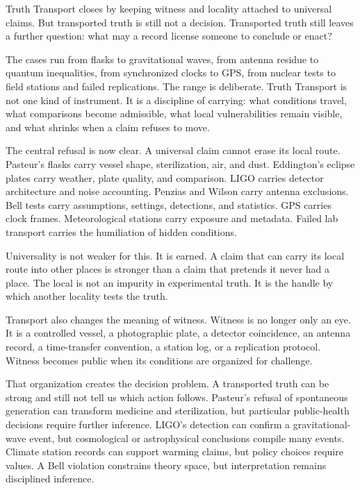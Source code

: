 \begin{movementclose}
Truth Transport closes by keeping witness and locality attached to
universal claims. But transported truth is still not a decision.
Transported truth still leaves a further question: what may a record
license someone to conclude or enact?

The cases run from flasks to gravitational waves, from antenna residue
to quantum inequalities, from synchronized clocks to GPS, from nuclear
tests to field stations and failed replications. The range is
deliberate. Truth Transport is not one kind of instrument. It is a
discipline of carrying: what conditions travel, what comparisons become
admissible, what local vulnerabilities remain visible, and what shrinks
when a claim refuses to move.

The central refusal is now clear. A universal claim cannot erase its
local route. Pasteur's flasks carry vessel shape, sterilization, air,
and dust. Eddington's eclipse plates carry weather, plate quality, and
comparison. LIGO carries detector architecture and noise accounting.
Penzias and Wilson carry antenna exclusions. Bell tests carry
assumptions, settings, detections, and statistics. GPS carries clock
frames. Meteorological stations carry exposure and metadata. Failed lab
transport carries the humiliation of hidden conditions.

Universality is not weaker for this. It is earned. A claim that can
carry its local route into other places is stronger than a claim that
pretends it never had a place. The local is not an impurity in
experimental truth. It is the handle by which another locality tests the
truth.

Transport also changes the meaning of witness. Witness is no longer only
an eye. It is a controlled vessel, a photographic plate, a detector
coincidence, an antenna record, a time-transfer convention, a station
log, or a replication protocol. Witness becomes public when its
conditions are organized for challenge.

That organization creates the decision problem. A transported truth can
be strong and still not tell us which action follows. Pasteur's refusal of
spontaneous generation can transform medicine and sterilization, but
particular public-health decisions require further inference. LIGO's
detection can confirm a gravitational-wave event, but cosmological or
astrophysical conclusions compile many events. Climate station records
can support warming claims, but policy choices require values. A Bell
violation constrains theory space, but interpretation remains
disciplined inference.


\end{movementclose}
